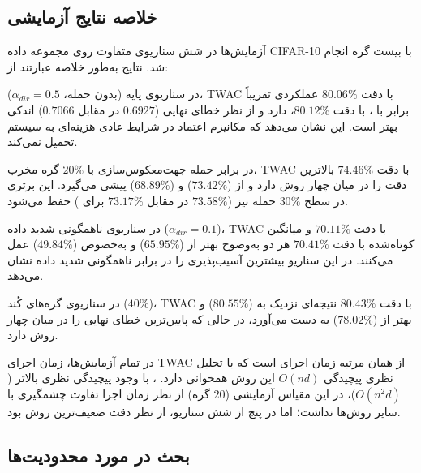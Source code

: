 \subsection{خلاصه نتایج آزمایشی}

آزمایش‌ها در شش سناریوی متفاوت روی مجموعه داده \gls{CIFAR}-10 با بیست گره انجام شد. نتایج به‌طور خلاصه عبارتند از:

\begin{itemize}
    \tick در سناریوی پایه (بدون حمله، $\alpha_{dir}=0.5$)، \gls{TWAC} با دقت $80.06\%$ عملکردی تقریباً برابر با ، با دقت $80.12\%$، دارد و از نظر خطای نهایی ($0.6927$ در مقابل $0.7066$) اندکی بهتر است. این نشان می‌دهد که مکانیزم اعتماد در شرایط عادی هزینه‌ای به سیستم تحمیل نمی‌کند.
    
    \tick در برابر حمله جهت‌معکوس‌سازی با $20\%$ گره مخرب، \gls{TWAC} با دقت $74.46\%$ بالاترین دقت را در میان چهار روش دارد و از  ($73.42\%$) و  ($68.89\%$) پیشی می‌گیرد. این برتری در سطح $30\%$ حمله نیز ($73.58\%$ در مقابل $73.17\%$ برای ) حفظ می‌شود.
    
    \tick در سناریوی ناهمگونی شدید داده ($\alpha_{dir}=0.1$)، \gls{TWAC} با دقت $70.11\%$ و میانگین کوتاه‌شده با دقت $70.41\%$ هر دو به‌وضوح بهتر از  ($65.95\%$) و به‌خصوص  ($49.84\%$) عمل می‌کنند.  در این سناریو بیشترین آسیب‌پذیری را در برابر ناهمگونی شدید داده نشان می‌دهد.
    
    \tick در سناریوی گره‌های کُند ($40\%$)، \gls{TWAC} با دقت $80.43\%$ نتیجه‌ای نزدیک به  ($80.55\%$) و بهتر از  ($78.02\%$) به دست می‌آورد، در حالی که پایین‌ترین خطای نهایی را در میان چهار روش دارد.
    
    \tick در تمام آزمایش‌ها، زمان اجرای \gls{TWAC} از همان مرتبه زمان اجرای  است که با تحلیل نظری پیچیدگی $O(nd)$ این روش همخوانی دارد. ، با وجود پیچیدگی نظری بالاتر ($O(n^2d)$)، در این مقیاس آزمایشی ($20$ گره) از نظر زمان اجرا تفاوت چشمگیری با سایر روش‌ها نداشت؛ اما در پنج از شش سناریو، از نظر دقت ضعیف‌ترین روش بود.
\end{itemize}

\subsection{بحث در مورد محدودیت‌ها}

